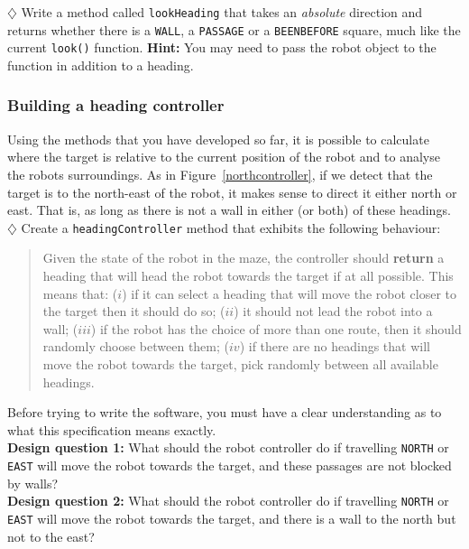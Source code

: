 \noindent
$\diamondsuit$ Write a method called {\tt lookHeading} that takes an {\it absolute} direction
and returns whether there is a {\tt WALL}, a {\tt PASSAGE} or a {\tt BEENBEFORE} square, much 
like the current {\tt look()} function. {\bf Hint:} You may need to pass the robot object to 
the function in addition to a heading.

\subsubsection{Building a heading controller}

\noindent
Using the methods that you have developed so far, it is 
possible to calculate where the target is relative to the current position of
the robot and to analyse the robots surroundings. 
As in Figure~\ref{northcontroller}, if we detect that the target
is to the north-east of the robot, it makes sense to direct it either 
north or east. That is, as long as there is not a wall in either (or both)
of these headings. \\

\noindent
$\diamondsuit$ Create a {\tt headingController} method that exhibits the following behaviour:

\begin{quote}
Given the state of the robot in the maze, the controller should {\bf return} a
heading that will head the robot towards the target if at all possible. 
This means that: ($i$) if it can select a heading that will move the robot
closer to the target then it should do so; ($ii$) it should not lead the 
robot into a wall; ($iii$) if the robot has the choice of more than one 
route, then it should randomly choose between them; ($iv$) if there
are no headings that will move the robot towards the target, pick randomly
between all available headings.
\end{quote}

\noindent
Before trying to write the software, you must have a clear understanding 
as to what this specification means exactly. \\

\noindent
{\bf Design question 1:} What should the robot controller do if travelling
{\tt NORTH} or {\tt EAST} will move the robot towards the target, and these 
passages are not blocked by walls? \\

\noindent
{\bf Design question 2:} What should the robot controller do if travelling
{\tt NORTH} or {\tt EAST} will move the robot towards the target, and there
is a wall to the north but not to the east? \\

